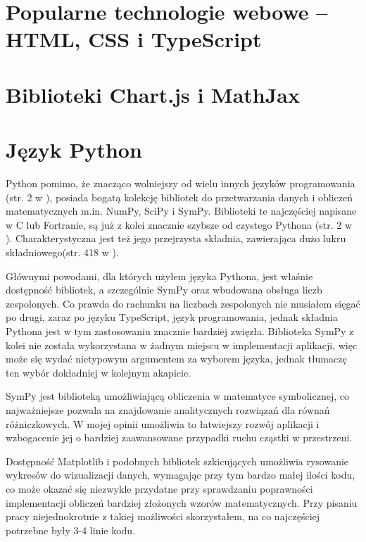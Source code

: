 \documentclass{SGGW-thesis}
\begin{document}
	\section{Popularne technologie webowe -- HTML, CSS i TypeScript}
	
	\section{Biblioteki Chart.js i MathJax}
	\section{Język Python}
	Python pomimo, że znacząco wolniejszy od wielu innych języków programowania (str. 2 w \cite{Python}), posiada bogatą kolekcję bibliotek do przetwarzania danych i obliczeń matematycznych m.in. NumPy, SciPy i SymPy. Biblioteki te najczęściej napisane w C lub Fortranie, są już z kolei znacznie szybsze od czystego Pythona (str. 2 w \cite{Python}). Charakterystyczna jest też jego przejrzysta składnia, zawierająca dużo lukru składniowego(str. 418 w \cite{Python}).
	
	Głównymi powodami, dla których użyłem języka Pythona, jest właśnie dostępność bibliotek, a szczególnie SymPy oraz wbudowana obsługa liczb zespolonych. Co prawda do rachunku na liczbach zespolonych nie musiałem sięgać po drugi, zaraz po języku TypeScript, język programowania, jednak składnia Pythona jest w tym zastosowaniu znacznie bardziej zwięzła. Biblioteka SymPy z kolei nie została wykorzystana w żadnym miejscu w implementacji aplikacji, więc może się wydać nietypowym argumentem za wyborem języka, jednak tłumaczę ten wybór dokładniej w kolejnym akapicie. 
	
	SymPy jest biblioteką umożliwiającą obliczenia w matematyce symbolicznej\cite{sympy}, co najważniejsze pozwala na znajdowanie analitycznych rozwiązań dla równań różniczkowych. W mojej opinii umożliwia to łatwiejszy rozwój aplikacji i wzbogacenie jej o bardziej zaawansowane przypadki ruchu cząstki w przestrzeni.
	
	Dostępność Matplotlib i podobnych bibliotek szkicujących umożliwia rysowanie wykresów do wizualizacji danych, wymagając przy tym bardzo małej ilości kodu, co może okazać się niezwykle przydatne przy sprawdzaniu poprawności implementacji obliczeń bardziej złożonych wzorów matematycznych. Przy pisaniu pracy niejednokrotnie z takiej możliwości skorzystałem, na co najczęściej potrzebne były 3-4 linie kodu.
	
\end{document}
